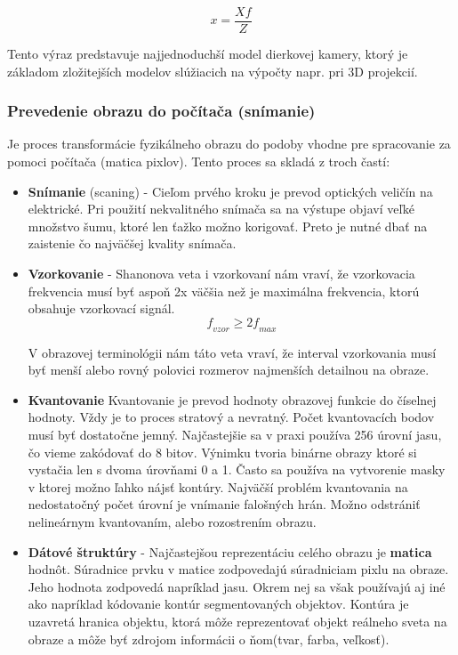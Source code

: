 $$\textit{x}=\frac{X\textit{f}}{Z}$$

Tento výraz predstavuje najjednoduchší model dierkovej kamery, ktorý je základom zložitejších modelov slúžiacich na výpočty napr. pri 3D projekcií. 

\subsubsection{Prevedenie obrazu do počítača (snímanie)}
Je proces transformácie fyzikálneho obrazu do podoby vhodne pre spracovanie za pomoci počítača (matica pixlov). Tento proces sa skladá z troch častí: 
\begin{itemize}
\item \textbf{Snímanie} (scaning) - Cieľom prvého kroku je prevod optických veličín na elektrické. Pri použití nekvalitného snímača sa na výstupe objaví veľké množstvo šumu, ktoré len ťažko možno korigovať. Preto je nutné dbať na zaistenie čo najväčšej kvality snímača. 

\item \textbf{Vzorkovanie} - Shanonova veta i vzorkovaní nám vraví, že vzorkovacia frekvencia musí byť aspoň 2x väčšia než je maximálna frekvencia, ktorú obsahuje vzorkovací signál.
$$\textit{f}_{\textit{vzor}} \ge {2} \textit{f}_{\textit{max}}$$

V obrazovej terminológii nám táto veta vraví, že interval vzorkovania musí byť menší alebo rovný polovici rozmerov najmenších detailnou na obraze. 

\item \textbf{Kvantovanie} 
Kvantovanie je prevod hodnoty obrazovej funkcie do číselnej hodnoty. Vždy je to proces stratový a nevratný. Počet kvantovacích bodov musí byť dostatočne jemný. Najčastejšie sa v praxi používa 256 úrovní jasu, čo vieme zakódovať do 8 bitov. Výnimku tvoria binárne obrazy ktoré si vystačia len s dvoma úrovňami 0 a 1. Často sa používa na vytvorenie masky v ktorej možno ľahko nájsť kontúry. Najväčší problém kvantovania na nedostatočný počet úrovní je vnímanie falošných hrán. Možno odstrániť nelineárnym kvantovaním, alebo rozostrením obrazu. 



\item \textbf{Dátové štruktúry} - Najčastejšou reprezentáciu celého obrazu je \textbf{matica} hodnôt. Súradnice prvku v matice zodpovedajú súradniciam pixlu na obraze. Jeho hodnota zodpovedá napríklad jasu.  Okrem nej sa však používajú aj iné ako napríklad kódovanie kontúr segmentovaných objektov. Kontúra je uzavretá hranica objektu, ktorá môže reprezentovať objekt reálneho sveta na obraze a môže byť zdrojom informácii o ňom(tvar, farba, veľkosť).


\end{itemize}
